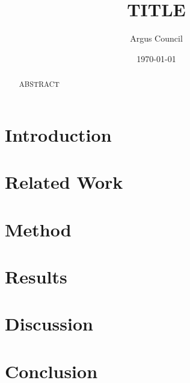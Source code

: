 \documentclass[11pt]{article}
\title{TITLE}
\author{Argus Council}
\date{\today}
\begin{document}
\maketitle

\begin{abstract}
ABSTRACT
\end{abstract}

\section{Introduction}

\section{Related Work}

\section{Method}

\section{Results}

\section{Discussion}

\section{Conclusion}



\end{document}

